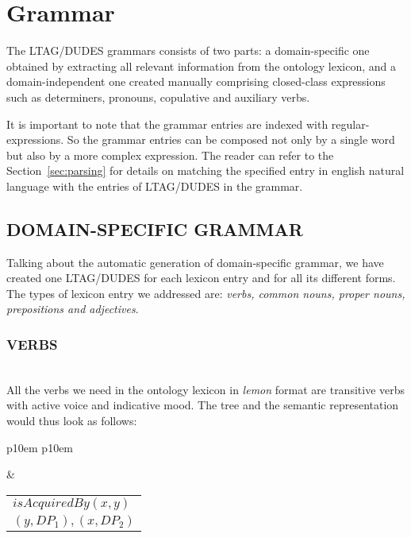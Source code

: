 \section{Grammar}
\label{sec:grammar}

The LTAG/DUDES grammars consists of two parts: a domain-specific one obtained by extracting all relevant information from the ontology lexicon, and a domain-independent one created manually comprising closed-class expressions such as determiners, pronouns, copulative and auxiliary verbs.

It is important to note that the grammar entries are indexed with regular-expressions. So the grammar entries can be composed not only by a single word but also by a more complex expression. The reader can refer to the Section~\ref{sec:parsing} for details on matching the specified entry in english natural language with the entries of LTAG/DUDES in the grammar.

\subsection{DOMAIN-SPECIFIC GRAMMAR}
Talking about the automatic generation of domain-specific grammar, we have created one LTAG/DUDES for each lexicon entry and for all its different forms. The types of lexicon entry we addressed are: \textit{verbs, common nouns, proper nouns, prepositions and adjectives}.

\subsubsection{VERBS}\mbox{}\\
All the verbs we need in the ontology lexicon in \textit{lemon} format are transitive verbs with active voice and indicative mood. The tree and the semantic representation would thus look as follows:

\medskip
\begin{center}
\begin{tabular}{ p{10em} p{10em} }
	\label{tbl:grammar.acquire}
	
	\begin{center}
		\begin{tikzpicture}
		\Tree [.S [.DP$_1\downarrow$ ] [.VP [.V acquire ] DP$_2\downarrow$ ] ]	
		\end{tikzpicture}
	\end{center}
	
	&

	\begin{center}
		\begin{tabular}{|c|l|}
			\hline
			\mbox{} & \mbox{}\\
			\hline
			\multicolumn{2}{|l|}{
				$isAcquiredBy(x,y)$
			} \\
			\hline
			\multicolumn{2}{|l|}{
				$(y,DP_{1}),(x,DP_{2})$
			} \\
			\hline
		\end{tabular}
	\end{center}	
	\\
\end{tabular}
\end{center}
\medskip

